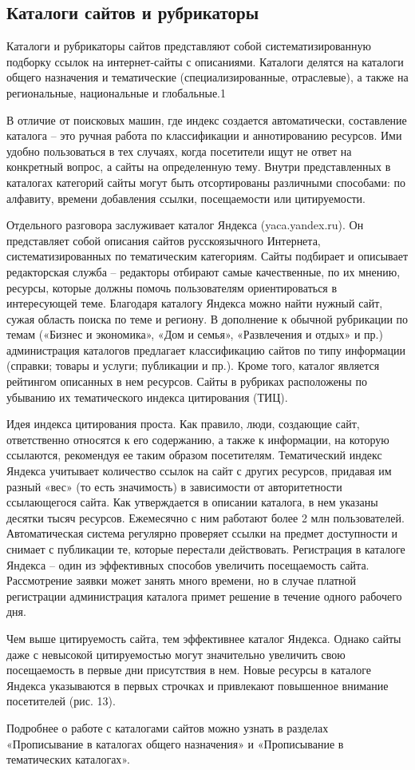 \documentclass[a4paper,english,russian]{G2-105}
\begin{document}
\subsection{Каталоги сайтов и рубрикаторы}
\par Каталоги и рубрикаторы сайтов представляют собой систематизированную подборку ссылок на интернет-сайты с описаниями. Каталоги делятся на каталоги общего назначения и тематические (специализированные, отраслевые), а также на региональные, национальные и глобальные.1
\par В отличие от поисковых машин, где индекс создается автоматически, составление каталога – это ручная работа по классификации и аннотированию ресурсов. Ими удобно пользоваться в тех случаях, когда посетители ищут не ответ на конкретный вопрос, а сайты на определенную тему. Внутри представленных в каталогах категорий сайты могут быть отсортированы различными способами: по алфавиту, времени добавления ссылки, посещаемости или цитируемости.
\par Отдельного разговора заслуживает каталог Яндекса (yaca.yandex.ru). Он представляет собой описания сайтов русскоязычного Интернета, систематизированных по тематическим категориям. Сайты подбирает и описывает редакторская служба – редакторы отбирают самые качественные, по их мнению, ресурсы, которые должны помочь пользователям ориентироваться в интересующей теме. Благодаря каталогу Яндекса можно найти нужный сайт, сужая область поиска по теме и региону. В дополнение к обычной рубрикации по темам («Бизнес и экономика», «Дом и семья», «Развлечения и отдых» и пр.) администрация каталогов предлагает классификацию сайтов по типу информации (справки; товары и услуги; публикации и пр.). Кроме того, каталог является рейтингом описанных в нем ресурсов. Сайты в рубриках расположены по убыванию их тематического индекса цитирования (ТИЦ). 
\par Идея индекса цитирования проста. Как правило, люди, создающие сайт, ответственно относятся к его содержанию, а также к информации, на которую ссылаются, рекомендуя ее таким образом посетителям. Тематический индекс Яндекса учитывает количество ссылок на сайт с других ресурсов, придавая им разный «вес» (то есть значимость) в зависимости от авторитетности ссылающегося сайта. Как утверждается в описании каталога, в нем указаны десятки тысяч ресурсов. Ежемесячно с ним работают более 2 млн пользователей. Автоматическая система регулярно проверяет ссылки на предмет доступности и снимает с публикации те, которые перестали действовать. Регистрация в каталоге Яндекса – один из эффективных способов увеличить посещаемость сайта. Рассмотрение заявки может занять много времени, но в случае платной регистрации администрация каталога примет решение в течение одного рабочего дня.
\par Чем выше цитируемость сайта, тем эффективнее каталог Яндекса. Однако сайты даже с невысокой цитируемостью могут значительно увеличить свою посещаемость в первые дни присутствия в нем. Новые ресурсы в каталоге Яндекса указываются в первых строчках и привлекают повышенное внимание посетителей (рис. 13).
\par Подробнее о работе с каталогами сайтов можно узнать в разделах «Прописывание в каталогах общего назначения» и «Прописывание в тематических каталогах».
\end{document}
